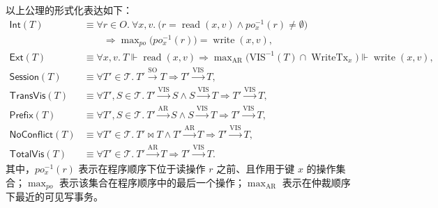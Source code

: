 以上公理的形式化表达如下：
\begin{equation}
    \label{eq:consistency}
    \begin{aligned}
        \mathsf{Int}(T)        & \equiv \forall r \in O.\ \forall x, v.\ \bigl(r = \operatorname{read}(x, v) \land po_x^{-1}(r) \neq \emptyset\bigr)                                                                                   \\
                               & \qquad\Rightarrow \max\nolimits_{po}\bigl(po_x^{-1}(r)\bigr) = \operatorname{write}(x, v),                                                                                                            \\[0.4em]
        \mathsf{Ext}(T)        & \equiv \forall x, v.\ T \Vdash \operatorname{read}(x, v) \Rightarrow \max\nolimits_{\text{AR}}\bigl(\operatorname{VIS^{-1}}(T) \cap \operatorname{WriteTx}_x\bigr) \Vdash \operatorname{write}(x, v), \\[0.4em]
        \mathsf{Session}(T)    & \equiv \forall T' \in \mathcal{T}.\ T' \xrightarrow{\text{SO}} T \Rightarrow T' \xrightarrow{\text{VIS}} T,                                                                                           \\[0.4em]
        \mathsf{TransVis}(T)   & \equiv \forall T', S \in \mathcal{T}.\ T' \xrightarrow{\text{VIS}} S \land S \xrightarrow{\text{VIS}} T \Rightarrow T' \xrightarrow{\text{VIS}} T,                                                    \\[0.4em]
        \mathsf{Prefix}(T)     & \equiv \forall T', S \in \mathcal{T}.\ T' \xrightarrow{\text{AR}} S \land S \xrightarrow{\text{VIS}} T \Rightarrow T' \xrightarrow{\text{VIS}} T,                                                     \\[0.4em]
        \mathsf{NoConflict}(T) & \equiv \forall T' \in \mathcal{T}.\ T' \bowtie T \land T' \xrightarrow{\text{AR}} T \Rightarrow T' \xrightarrow{\text{VIS}} T,                                                                        \\[0.4em]
        \mathsf{TotalVis}(T)   & \equiv \forall T' \in \mathcal{T}.\ T' \xrightarrow{\text{AR}} T \Rightarrow T' \xrightarrow{\text{VIS}} T.
    \end{aligned}
\end{equation}
其中，$po_x^{-1}(r)$ 表示在程序顺序下位于读操作 $r$ 之前、且作用于键 $x$ 的操作集合；$\max_{po}$ 表示该集合在程序顺序中的最后一个操作；$\max_{\text{AR}}$ 表示在仲裁顺序下最近的可见写事务。

